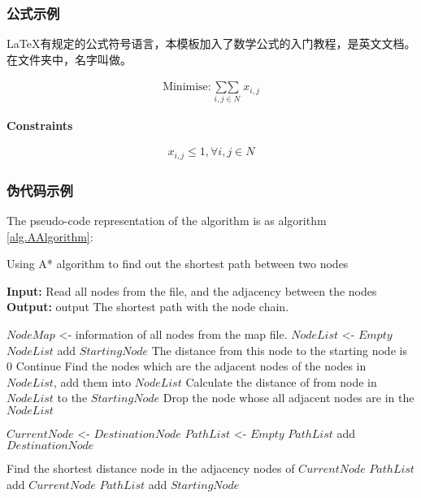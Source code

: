 \documentclass{nitthesis}
\begin{document}
\subsubsection{公式示例}

\LaTeX{}有规定的公式符号语言，本模板加入了数学公式的入门教程，是英文文档。在文件夹中，名字叫做\href{doc/The LaTeX Mathematics Companion-Gai.pdf}{}。

\begin{align}
    \text{Minimise:} \mathop {\sum \sum }\limits_{i,j \in N} {x_{i,j}}
\end{align}

\textbf{Constraints}

\begin{align}
    {x_{i,j}} \le 1,\forall i,j \in N
\end{align}

\subsubsection{伪代码示例}

The pseudo-code representation of the algorithm is as algorithm \ref{alg.AAlgorithm}:

\begin{algorithm}
    \caption{Using A* algorithm to find out the shortest path between two nodes}
    \hspace*{0.02in} {\bf Input:}
    Read all nodes from the file, and the adjacency between the nodes\\
    \hspace*{0.02in} {\bf Output:}
    output The shortest path with the node chain.
    \begin{algorithmic}[1]
        \State $Node Map$ <- information of all nodes from the map file.
        \State $Node List$ <- $Empty$ 
                \State $Node List$ add $Starting Node$
                \State The distance from this node to the starting node is $0$
                \State Continue
            \EndIf
            \State Find the nodes which are the adjacent nodes of the nodes in $Node List$, add them into $Node List$
            \State Calculate the distance of from node in $Node List$ to the $Starting Node$
            \State Drop the node whose all adjacent nodes are in the $Node List$
        \EndWhile

        \State $Current Node$ <- $Destination Node$
        \State $Path List$ <- $Empty$
        \State $Path List$ add $Destination Node$

            \State Find the shortest distance node in the adjacency nodes of $Current Node$
            \State $Path List$ add $Current Node$
        \EndWhile
        \State $Path List$ add $Starting Node$
    \end{algorithmic}
    \label{alg.AAlgorithm}
\end{algorithm}
\end{document}

